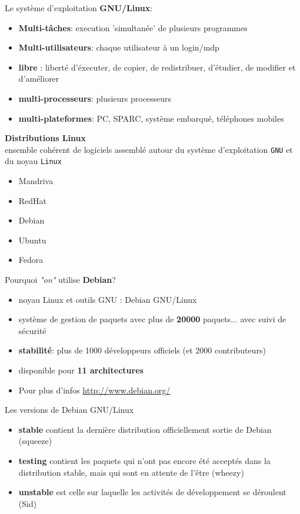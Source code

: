 \documentclass[french]{beamer}
\begin{document}
\begin{frame}
Le système d'exploitation \textbf{GNU/Linux}:
    \begin{itemize}
    \item \textbf{Multi-tâches}: execution 'simultanée' de plusieurs programmes
    \item \textbf{Multi-utilisateurs}: chaque utilisateur à un login/mdp
    \item \textbf{libre} : liberté d'éxecuter, de copier, de redistribuer, d'étudier, de
    modifier et d'améliorer
    \item \textbf{multi-processeurs}: plusieurs processeurs
    \item \textbf{multi-plateformes}: PC, SPARC, système embarqué, téléphones
    mobiles
    \end{itemize}
\end{frame}

\begin{frame}
\textbf{Distributions Linux} \\
ensemble cohérent de logiciels assemblé autour du système d'exploitation
\texttt{GNU} et du noyau \texttt{Linux}
    \begin{itemize}
    \item Mandriva 
    \item RedHat
    \item Debian
    \item Ubuntu
    \item Fedora
    \end{itemize}
\end{frame}

\begin{frame}
Pourquoi \textit{"on"} utilise \textbf{Debian}?

\begin{itemize}
\item noyau Linux et outils GNU : Debian GNU/Linux
\item système de gestion de paquets avec plus de \textbf{20000} paquets... avec suivi de sécurité
\item \textbf{stabilité}: plus de 1000 développeurs officiels (et 2000 contributeurs)
\item disponible pour \textbf{11 architectures} 
\item Pour plus d'infos \url{http://www.debian.org/}
\end{itemize}
\end{frame}

\begin{frame}
Les versions de Debian GNU/Linux
\begin{itemize}
\item \textbf{stable} contient la dernière distribution officiellement sortie de Debian (squeeze)
\item \textbf{testing} contient les paquets qui n'ont pas encore été acceptés dans la distribution stable, mais qui sont en attente de l'être (wheezy)
\item \textbf{unstable}  est celle sur laquelle les activités de développement se déroulent (Sid)
\end{itemize}
\end{frame}
\end{document}
